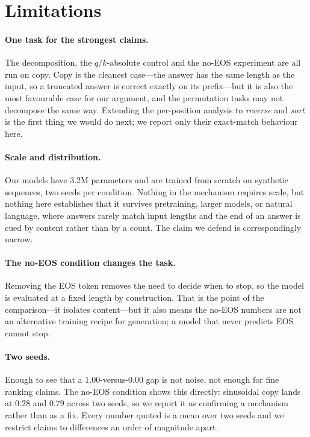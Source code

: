 \section{Limitations}
\label{sec:limitations}

\paragraph{One task for the strongest claims.} The decomposition, the
$q/k$-absolute control and the no-EOS experiment are all run on copy. Copy is the
cleanest case---the answer has the same length as the input, so a truncated answer
is correct exactly on its prefix---but it is also the most favourable case for our
argument, and the permutation tasks may not decompose the same way. Extending the
per-position analysis to \emph{reverse} and \emph{sort} is the first thing we would
do next; we report only their exact-match behaviour here.

\paragraph{Scale and distribution.} Our models have 3.2M parameters and are trained
from scratch on synthetic sequences, two seeds per condition. Nothing in the
mechanism requires scale, but nothing here establishes that it survives
pretraining, larger models, or natural language, where answers rarely match input
lengths and the end of an answer is cued by content rather than by a count. The
claim we defend is correspondingly narrow.

\paragraph{The no-EOS condition changes the task.} Removing the EOS token removes
the need to decide when to stop, so the model is evaluated at a fixed length by
construction. That is the point of the comparison---it isolates content---but it
also means the no-EOS numbers are not an alternative training recipe for
generation; a model that never predicts EOS cannot stop.

\paragraph{Two seeds.} Enough to see that a $1.00$-versus-$0.00$ gap is not noise,
not enough for fine ranking claims. The no-EOS condition shows this directly:
sinusoidal copy lands at $0.28$ and $0.79$ across two seeds, so we report it as
confirming a mechanism rather than as a fix. Every number quoted is a mean over two
seeds and we restrict claims to differences an order of magnitude apart.

